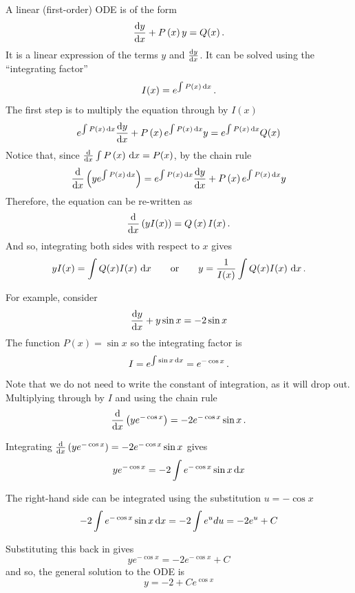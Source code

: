 
A linear (first-order) ODE is of the form
\[
\frac{{\rm d} y}{{\rm d} x}+P\left(x\right)y=Q(x) \, .
\]
It is a linear expression of the terms $y$ and $\frac{{\rm d} y}{{\rm d} x}$. It can be solved using the ``integrating factor''
\[
I(x)={e}^{\int P\left(x\right)\, {\rm d}x} \, .
\]
The first step is to multiply the equation through by $I(x)$
\[
{e}^{\int P\left(x\right)\, {\rm d}x}\frac{{\rm d} y}{{\rm d} x}+P\left(x\right){e}^{\int P\left(x\right)\, {\rm d}x}y={e}^{\int P\left(x\right)\, {\rm d}x}Q(x)
\]
Notice that, since $\frac{{\rm d} }{{\rm d} x}\int P\left(x\right)\, {\rm d}x=P(x)$, by the chain rule
\[
\frac{{\rm d} }{{\rm d} x}\left(y{e}^{\int P\left(x\right)\, {\rm d}x}\right)={e}^{\int P\left(x\right)\, {\rm d}x}\frac{{\rm d} y}{{\rm d} x}+P\left(x\right){e}^{\int P\left(x\right)\, {\rm d}x}y
\]
Therefore, the equation can be re-written as
\[
\frac{{\rm d} }{{\rm d} x}\left(yI(x)\right)=Q\left(x\right)I(x) \, .
\]
And so, integrating both sides with respect to $x$ gives
\[
yI(x)=\int Q(x)I(x)\,\, {\rm d}x\qquad\text{or}\qquad y=\frac{1}{I(x)}\int Q(x)I(x)\,\, {\rm d}x\, .
\]


For example, consider
\[
\frac{{\rm d} y}{{\rm d} x}+y\sin x=-2\sin x
\]
The function $P\left(x\right)=\sin x$ so the integrating factor is
\[
I={e}^{\int \sin x\, {\rm d}x}={e}^{-\cos x} \, .
\]
Note that we do not need to write the constant of integration, as it will drop out. Multiplying through by $I$ and using the chain rule
\[
\frac{{\rm d} }{{\rm d} x}\left(y{ e}^{-\cos x}\right)=-2{e}^{-\cos x}\sin x \, .
\]

Integrating $\frac{{\rm d} }{{\rm d} x}\left(y{ e}^{-\cos x}\right)=-2{e}^{-\cos x}\sin x$ gives
\[
y{ e}^{-\cos x}=-2\int {e}^{-\cos x}\sin x\, {\rm d}x
\]

The right-hand side can be integrated using the substitution $u=-\cos x$
\[
-2\int {e}^{-\cos x}\sin x\, {\rm d}x=-2\int {e}^{u}du=-2{e}^{u}+C
\]

Substituting this back in gives
\[
y{ e}^{-\cos x}=-2{e}^{-\cos x}+C
\]
and so, the general solution to the ODE is
\[
y=-2+C{e}^{\cos x}
\]


